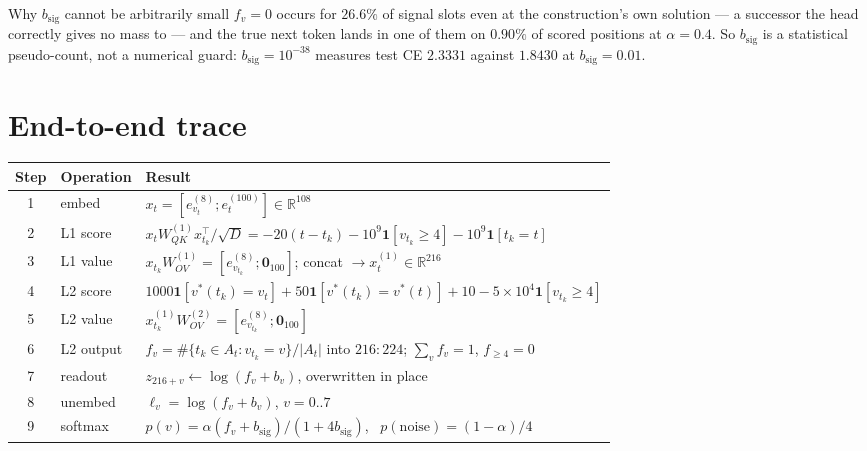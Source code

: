 \documentclass[11pt]{article}
\newcommand{\R}{\mathbb{R}}
\newcommand{\Wqk}{W_{QK}}
\newcommand{\Wov}{W_{OV}}
\newcommand{\sd}{\sqrt{D}}
\begin{document}
\begin{notebox}{Why $b_{\mathrm{sig}}$ cannot be arbitrarily small}
$f_v=0$ occurs for $26.6\%$ of signal slots even at the construction's own solution --- a
successor the head correctly gives no mass to --- and the true next token lands in one of them on
$0.90\%$ of scored positions at $\alpha=0.4$. So $b_{\mathrm{sig}}$ is a statistical
pseudo-count, not a numerical guard: $b_{\mathrm{sig}}=10^{-38}$ measures test CE $2.3331$
against $1.8430$ at $b_{\mathrm{sig}}=0.01$.
\end{notebox}

\section{End-to-end trace}
\begin{center}
\begin{tabular}{@{}clp{10.0cm}@{}}
\toprule
\textbf{Step} & \textbf{Operation} & \textbf{Result}\\
\midrule
1 & embed & $x_t=[e^{(8)}_{v_t};e^{(100)}_t]\in\R^{108}$\\
2 & L1 score & $x_{t}\Wqk^{(1)}x_{t_k}^\top/\sd=-20(t-t_k)-10^9\bm{1}[v_{t_k}\!\ge\!4]-10^9\bm{1}[t_k\!=\!t]$\\
3 & L1 value & $x_{t_k}\Wov^{(1)}=[e^{(8)}_{v_{t_k}};\bm{0}_{100}]$; concat $\to x^{(1)}_t\in\R^{216}$\\
4 & L2 score & $1000\bm{1}[v^*(t_k)=v_t]+50\bm{1}[v^*(t_k)=v^*(t)]+10-5{\times}10^4\bm{1}[v_{t_k}\!\ge\!4]$\\
5 & L2 value & $x^{(1)}_{t_k}\Wov^{(2)}=[e^{(8)}_{v_{t_k}};\bm{0}_{100}]$\\
6 & L2 output & $f_v=\#\{t_k\in A_t:v_{t_k}=v\}/|A_t|$ into $216{:}224$; $\sum_v f_v=1$, $f_{\ge4}=0$\\
7 & readout & $z_{216+v}\leftarrow\log(f_v+b_v)$, overwritten in place\\
8 & unembed & $\ell_v=\log(f_v+b_v)$, $v=0..7$\\
9 & softmax & $p(v)=\alpha(f_v+b_{\mathrm{sig}})/(1+4b_{\mathrm{sig}})$, \ $p(\text{noise})=(1-\alpha)/4$\\
\bottomrule
\end{tabular}
\end{center}

\end{document}
